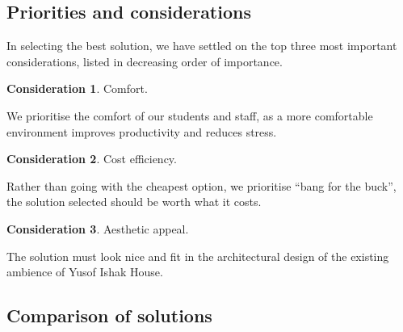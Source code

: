 \documentclass[british,a4paper,]{article}
\theoremstyle{definition}
\newtheorem{solution}{Solution}
\newtheorem{consideration}{Consideration}
\newtheorem{observation}[definition]{Observation}
\begin{document}
%
%

\subsection{Priorities and considerations}

In selecting the best solution, we have settled on the top three most important considerations, listed in decreasing order of importance.

\begin{consideration} \label{consider:comfort}
    Comfort.

    We prioritise the comfort of our students and staff, as a more comfortable environment improves productivity and reduces stress.
\end{consideration}
\begin{consideration} \label{consider:cost}
    Cost efficiency.

    Rather than going with the cheapest option, we prioritise ``bang for the buck'',
    the solution selected should be worth what it costs.
\end{consideration}
\begin{consideration} \label{consider:aesthetic}
    Aesthetic appeal.

    The solution must look nice and fit in the architectural design of the existing ambience of Yusof Ishak House.
\end{consideration}

\subsection{Comparison of solutions}
\end{document}
